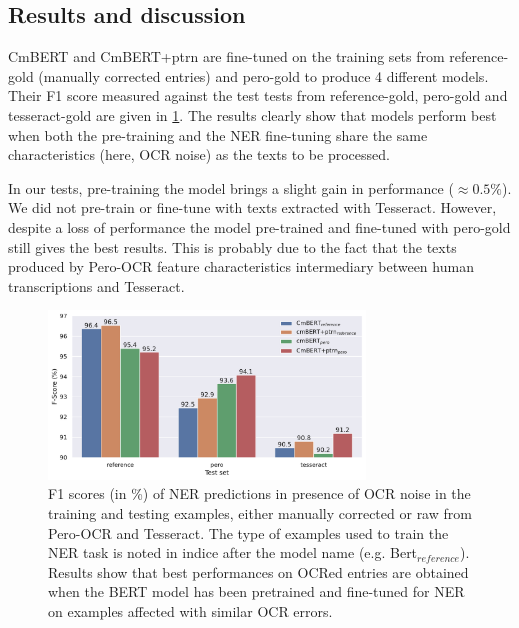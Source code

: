 \subsection{Results and discussion}


CmBERT and CmBERT+ptrn are fine-tuned on the training sets from reference-gold (manually corrected entries) and pero-gold to produce 4 different models.
Their F1 score measured against the test tests from reference-gold, pero-gold and tesseract-gold are given in \cref{fig:exp_2_eval_ner}.
The results clearly show that models perform best when both the pre-training and the NER fine-tuning share the same characteristics (here, OCR noise) as the texts to be processed.

In our tests, pre-training the model brings a slight gain in performance ($\approx 0.5\%$).
We did not pre-train or fine-tune with texts extracted with Tesseract.
However, despite a loss of performance the model pre-trained and fine-tuned with pero-gold still gives the best results.
This is probably due to the fact that the texts produced by Pero-OCR feature characteristics intermediary between human transcriptions and Tesseract.

\begin{figure}
    \centering
    \includegraphics[width=0.75\textwidth]{images/experiment_2_f1_with_noise_graph.pdf}
    \caption{F1 scores (in \%) of NER predictions in presence of OCR noise in the training and testing examples, either manually corrected or raw from Pero-OCR and Tesseract. The type of examples used to train the NER task is noted in indice after the model name (e.g. Bert$_{reference}$). Results show that best performances on OCRed entries are obtained when the BERT model has been pretrained and fine-tuned for NER on examples affected with similar OCR errors.}
    \label{fig:exp_2_eval_ner}
\end{figure}

